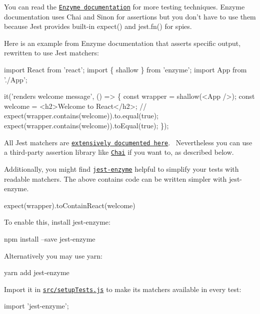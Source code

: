 You can read the \href{http://airbnb.io/enzyme/}{\tt Enzyme documentation} for more testing techniques. Enzyme documentation uses Chai and Sinon for assertions but you don’t have to use them because Jest provides built-\/in {\ttfamily expect()} and {\ttfamily jest.\+fn()} for spies.

Here is an example from Enzyme documentation that asserts specific output, rewritten to use Jest matchers\+:


\begin{DoxyCode}
import React from 'react';
import \{ shallow \} from 'enzyme';
import App from './App';

it('renders welcome message', () => \{
  const wrapper = shallow(<App />);
  const welcome = <h2>Welcome to React</h2>;
  // expect(wrapper.contains(welcome)).to.equal(true);
  expect(wrapper.contains(welcome)).toEqual(true);
\});
\end{DoxyCode}


All Jest matchers are \href{http://facebook.github.io/jest/docs/expect.html}{\tt extensively documented here}.~\newline
 Nevertheless you can use a third-\/party assertion library like \href{http://chaijs.com/}{\tt Chai} if you want to, as described below.

Additionally, you might find \href{https://github.com/blainekasten/enzyme-matchers}{\tt jest-\/enzyme} helpful to simplify your tests with readable matchers. The above {\ttfamily contains} code can be written simpler with jest-\/enzyme.


\begin{DoxyCode}
expect(wrapper).toContainReact(welcome)
\end{DoxyCode}


To enable this, install {\ttfamily jest-\/enzyme}\+:


\begin{DoxyCode}
npm install --save jest-enzyme
\end{DoxyCode}


Alternatively you may use {\ttfamily yarn}\+:


\begin{DoxyCode}
yarn add jest-enzyme
\end{DoxyCode}


Import it in \href{#initializing-test-environment}{\tt {\ttfamily src/setup\+Tests.\+js}} to make its matchers available in every test\+:


\begin{DoxyCode}
import 'jest-enzyme';
\end{DoxyCode}


